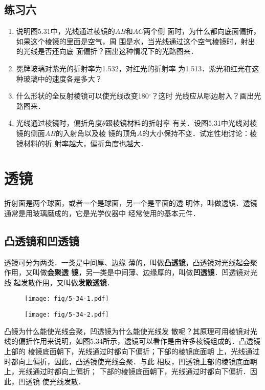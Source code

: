 \subsection*{练习六}
\begin{enumerate}
    \item 说明图5.31中，光线通过棱镜的$AB$和$AC$两个侧
面时，为什么都向底面偏折，如果这个棱镜的里面是空气，周
围是水，当光线通过这个空气棱镜时，射出的光线是否还向底
面偏折？画出这种情况下的光路图来．
\item 冕牌玻璃对紫光的折射率为1.532，对红光的折射率
为1.513．紫光和红光在这种玻璃中的速度各是多大？
\item 什么形状的全反射棱镜可以使光线改变180$^\circ$？这时
光线应从哪边射入？画出光路图来．
\item 光线通过棱镜时，偏折角度$\theta$跟棱镜材料的折射率
有关．设图5.31中光线对棱镜的侧面$AB$的入射角以及棱
镜的顶角$A$的大小保持不变．试定性地讨论：棱镜材料的折
射率越大，偏折角度也越大．
\end{enumerate}

\section{透镜}
折射面是两个球面，或者一个是球面，另一个是平面的透
明体，叫做透镜．透镜通常是用玻璃磨成的，它是光学仪器中
经常使用的基本元件．

\subsection{凸透镜和凹透镜}

透镜可分为两类．一类是中间厚、边缘
薄的，叫做\textbf{凸透镜}，凸透镜对光线起会聚作用，又叫做\textbf{会聚透
镜}，另一类是中间薄、边缘厚的，叫做\textbf{凹透镜}．凹透镜对光线
起发散作用，又叫做\textbf{发散透镜}．
\begin{figure}[htp]
    \centering
    \begin{minipage}[t]{0.48\textwidth}
    \centering
    \texttt{[image: fig/5-34-1.pdf]}
    \end{minipage}
    \begin{minipage}[t]{0.48\textwidth}
    \centering
    \texttt{[image: fig/5-34-2.pdf]}
    \end{minipage}
    \caption{}
    \end{figure}


凸镜为什么能使光线会聚，凹透镜为什么能使光线发
散呢？其原理可用棱镜对光线的偏折作用来说明，如图5.34所示，透镜可以看作是由许多棱镜组成的．凸透镜上部的
棱镜底面朝下，光线通过时都向下偏折；下部的棱镜底面朝
上，光线通过时都向上偏折，因此，凸透镜使光线会聚．与此
相反，凹透镜上部的棱镜底面朝上，光线通过时都向上偏折；
下部的棱镜底面朝下，光线通过时都向下偏折．因此，凹透镜
使光线发散．

